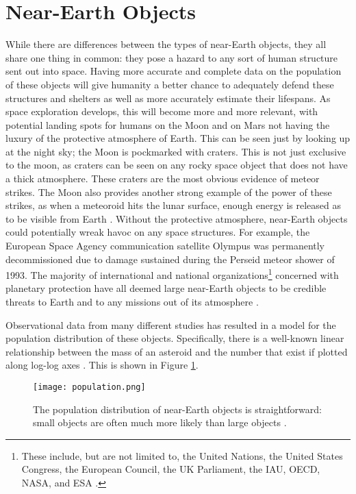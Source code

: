 \section{Near-Earth Objects}
While there are differences between the types of near-Earth objects, they all share one thing in common: they pose a hazard to any sort of human structure sent out into space. Having more accurate and complete data on the population of these objects will give humanity a better chance to adequately defend these structures and shelters as well as more accurately estimate their lifespans. As space exploration develops, this will become more and more relevant, with potential landing spots for humans on the Moon and on Mars not having the luxury of the protective atmosphere of Earth. This can be seen just by looking up at the night sky; the Moon is pockmarked with craters. This is not just exclusive to the moon, as craters can be seen on any rocky space object that does not have a thick atmosphere. These craters are the most obvious evidence of meteor strikes. The Moon also provides another strong example of the power of these strikes, as when a meteoroid hits the lunar surface, enough energy is released as to be visible from Earth \cite{Rembold2015}. Without the protective atmosphere, near-Earth objects could potentially wreak havoc on any space structures. For example, the European Space Agency communication satellite Olympus was permanently decommissioned due to damage sustained during the Perseid meteor shower of 1993. The majority of international and national organizations\footnote{These include, but are not limited to, the United Nations, the United States Congress, the European Council, the UK Parliament, the IAU, OECD, NASA, and ESA \cite{Bottke2007}.} concerned with planetary protection have all deemed large near-Earth objects to be credible threats to Earth and to any missions out of its atmosphere \cite{Bottke2007}.


Observational data from many different studies has resulted in a model for the population distribution of these objects. Specifically, there is a well-known linear relationship between the mass of an asteroid and the number that exist if plotted along log-log axes \cite{Rembold2015}. This is shown in Figure \ref{fig:population}.

\begin{figure}[ht!]
  \centering
  \texttt{[image: population.png]}
  \caption{The population distribution of near-Earth objects is straightforward: small objects are often much more likely than large objects \protect\cite{Rembold2015}.}
  \label{fig:population}
\end{figure}

